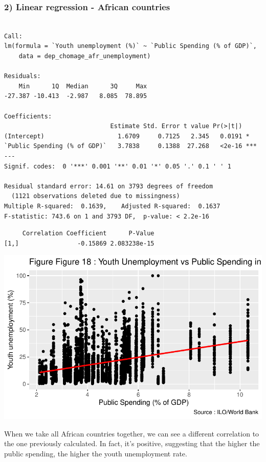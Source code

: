 \documentclass[
  letterpaper,
  DIV=11,
  numbers=noendperiod]{scrartcl}
\begin{document}
\hypertarget{linear-regression---african-countries}{%
\subsubsection{2) Linear regression - African
countries}\label{linear-regression---african-countries}}

\begin{verbatim}

Call:
lm(formula = `Youth unemployment (%)` ~ `Public Spending (% of GDP)`, 
    data = dep_chomage_afr_unemployment)

Residuals:
    Min      1Q  Median      3Q     Max 
-27.387 -10.413  -2.987   8.085  78.895 

Coefficients:
                             Estimate Std. Error t value Pr(>|t|)    
(Intercept)                    1.6709     0.7125   2.345   0.0191 *  
`Public Spending (% of GDP)`   3.7838     0.1388  27.268   <2e-16 ***
---
Signif. codes:  0 '***' 0.001 '**' 0.01 '*' 0.05 '.' 0.1 ' ' 1

Residual standard error: 14.61 on 3793 degrees of freedom
  (1121 observations deleted due to missingness)
Multiple R-squared:  0.1639,    Adjusted R-squared:  0.1637 
F-statistic: 743.6 on 1 and 3793 DF,  p-value: < 2.2e-16
\end{verbatim}

\begin{verbatim}
     Correlation Coefficient      P-Value
[1,]                -0.15869 2.083238e-15
\end{verbatim}

\includegraphics{Projet-BM_files/figure-pdf/unnamed-chunk-44-1.pdf}

When we take all African countries together, we can see a different
correlation to the one previously calculated. In fact, it's positive,
suggesting that the higher the public spending, the higher the youth
unemployment rate.
\end{document}
